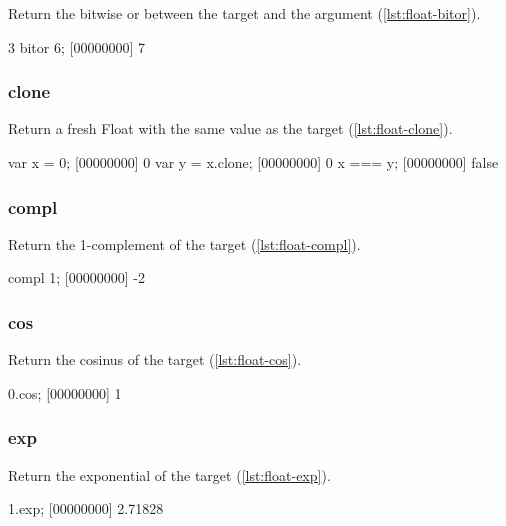 Return the bitwise or between the target and the argument (\autoref{lst:float-bitor}).

\begin{urbiscript}[caption=Float.bitor, label=lst:float-bitor]
3 bitor 6;
[00000000] 7
\end{urbiscript}

\subsubsection{clone}

Return a fresh Float with the same value as the target (\autoref{lst:float-clone}).

\begin{urbiscript}[caption=Float.clone, label=lst:float-clone]
var x = 0;
[00000000] 0
var y = x.clone;
[00000000] 0
x === y;
[00000000] false
\end{urbiscript}

\subsubsection{compl}

Return the 1-complement of the target (\autoref{lst:float-compl}).

\begin{urbiscript}[caption=Float.compl, label=lst:float-compl]
compl 1;
[00000000] -2
\end{urbiscript}

\subsubsection{cos}

Return the cosinus of the target (\autoref{lst:float-cos}).

\begin{urbiscript}[caption=Float.cos, label=lst:float-cos]
0.cos;
[00000000] 1
\end{urbiscript}

\subsubsection{exp}

Return the exponential of the target (\autoref{lst:float-exp}).

\begin{urbiscript}[caption=Float.exp, label=lst:float-exp]
1.exp;
[00000000] 2.71828
\end{urbiscript}

